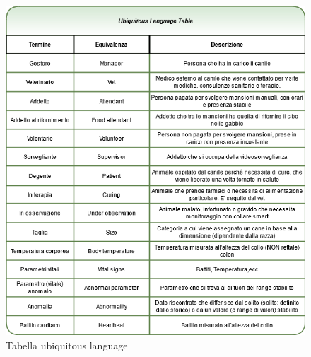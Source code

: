     \begin{figure}[ht]
        \caption{Tabella ubiquitous language}
        \centering
        \includegraphics[width=1\textwidth]{DrawIo/ubiquitousLanguage.png}
    \end{figure}
